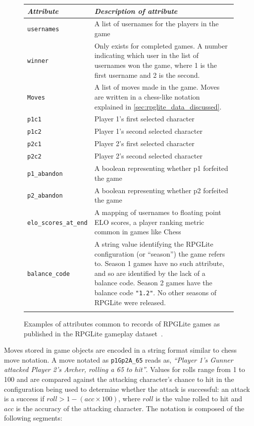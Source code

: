 \begin{figure}
  \centering
  \begin{tabular}{@{}lp{}@{}}
    \toprule{}
    \emph{Attribute} & \emph{Description of attribute}\\
    \midrule{}
    \rule{0pt}{2em}\lstinline[]$usernames$ & A list of usernames for the players in the game\\
    \rule{0pt}{2em}\lstinline[]$winner$ & Only exists for completed games. A number indicating
    which user in the list of usernames won the game, where 1 is the first
    username and 2 is the second. \\
    \rule{0pt}{2em}\lstinline[]$Moves$ & A list of moves made in the game. Moves are written in
   a chess-like notation explained in \cref{sec:rpglite_data_discussed}. \\
    \rule{0pt}{2em}\lstinline[]$p1c1$ & Player 1's first selected character \\
    \rule{0pt}{2em}\lstinline[]$p1c2$ & Player 1's second selected character \\
    \rule{0pt}{2em}\lstinline[]$p2c1$ & Player 2's first selected character  \\
    \rule{0pt}{2em}\lstinline[]$p2c2$ & Player 2's second selected character  \\
    \rule{0pt}{2em}\lstinline[]$p1_abandon$ & A boolean representing whether p1 forfeited the game \\
    \rule{0pt}{2em}\lstinline[]$p2_abandon$ & A boolean representing whether p2 forfeited the game \\
    \rule{0pt}{2em}\lstinline[]$elo_scores_at_end$ & A mapping of usernames to floating point
    ELO scores, a player ranking metric common in games like Chess~\cite{elo_ratings} \\
    \rule{0pt}{2em}\lstinline[]$balance_code$ & A string value identifying the RPGLite
    configuration (or ``season'') the game refers to. Season 1 games have no
    such attribute, and so are identified by the lack of a balance code. Season
    2 games have the balance code \lstinline[]$"1.2"$. No other seasons of
    RPGLite were released.\\
    \bottomrule{}
  \end{tabular}
  \caption{Examples of attributes common to records of RPGLite games as published in the RPGLite gameplay dataset~\cite{rpglite_dataset}.}
  \label{fig:gamedoc_attributes}
\end{figure}

Moves stored in game objects are encoded in a string format similar to chess
move notation. A move notated as \lstinline{p1Gp2A_65} reads as, \emph{``Player
1's Gunner attacked Player 2's Archer, rolling a 65 to hit''}. Values for rolls
range from 1 to 100 and are compared against the attacking character's chance to
hit in the configuration being used to determine whether the attack is
successful: an attack is a success if $roll > 1 - (acc \times 100)$, where
$roll$ is the value rolled to hit and $acc$ is the accuracy of the attacking
character. The notation is composed of the following segments: 

